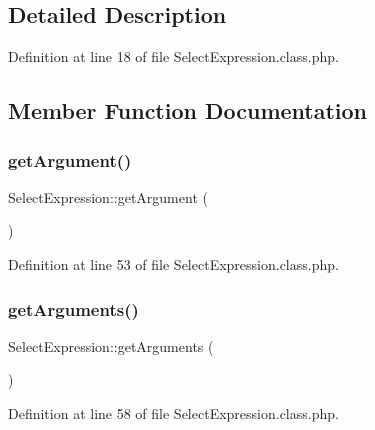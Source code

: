 \subsection{Detailed Description}


Definition at line 18 of file Select\+Expression.\+class.\+php.



\subsection{Member Function Documentation}
\mbox{\label{classSelectExpression_a1311337274f53d0f3705673e86990a0b}} 
\subsubsection{\texorpdfstring{get\+Argument()}{getArgument()}}
{\footnotesize\ttfamily Select\+Expression\+::get\+Argument (\begin{DoxyParamCaption}{ }\end{DoxyParamCaption})}



Definition at line 53 of file Select\+Expression.\+class.\+php.

\mbox{\label{classSelectExpression_a41d457ce5fc7cedc050c2c34a2286d9f}} 
\subsubsection{\texorpdfstring{get\+Arguments()}{getArguments()}}
{\footnotesize\ttfamily Select\+Expression\+::get\+Arguments (\begin{DoxyParamCaption}{ }\end{DoxyParamCaption})}



Definition at line 58 of file Select\+Expression.\+class.\+php.

\mbox{\label{classSelectExpression_a860e81d13389a53617fa27c377aa4e2c}} 
